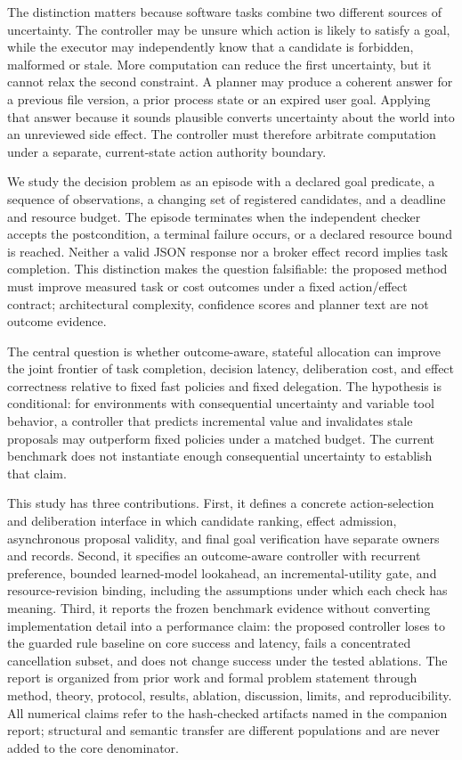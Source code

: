 \documentclass[11pt]{article}
\begin{document}
The distinction matters because software tasks combine two different sources of uncertainty. The controller may be unsure which action is likely to satisfy a goal, while the executor may independently know that a candidate is forbidden, malformed or stale. More computation can reduce the first uncertainty, but it cannot relax the second constraint. A planner may produce a coherent answer for a previous file version, a prior process state or an expired user goal. Applying that answer because it sounds plausible converts uncertainty about the world into an unreviewed side effect. The controller must therefore arbitrate computation under a separate, current-state action authority boundary.

We study the decision problem as an episode with a declared goal predicate, a sequence of observations, a changing set of registered candidates, and a deadline and resource budget. The episode terminates when the independent checker accepts the postcondition, a terminal failure occurs, or a declared resource bound is reached. Neither a valid JSON response nor a broker effect record implies task completion. This distinction makes the question falsifiable: the proposed method must improve measured task or cost outcomes under a fixed action/effect contract; architectural complexity, confidence scores and planner text are not outcome evidence.

The central question is whether outcome-aware, stateful allocation can improve the joint frontier of task completion, decision latency, deliberation cost, and effect correctness relative to fixed fast policies and fixed delegation. The hypothesis is conditional: for environments with consequential uncertainty and variable tool behavior, a controller that predicts incremental value and invalidates stale proposals may outperform fixed policies under a matched budget. The current benchmark does not instantiate enough consequential uncertainty to establish that claim.

This study has three contributions. First, it defines a concrete action-selection and deliberation interface in which candidate ranking, effect admission, asynchronous proposal validity, and final goal verification have separate owners and records. Second, it specifies an outcome-aware controller with recurrent preference, bounded learned-model lookahead, an incremental-utility gate, and resource-revision binding, including the assumptions under which each check has meaning. Third, it reports the frozen benchmark evidence without converting implementation detail into a performance claim: the proposed controller loses to the guarded rule baseline on core success and latency, fails a concentrated cancellation subset, and does not change success under the tested ablations. The report is organized from prior work and formal problem statement through method, theory, protocol, results, ablation, discussion, limits, and reproducibility. All numerical claims refer to the hash-checked artifacts named in the companion report; structural and semantic transfer are different populations and are never added to the core denominator.
\end{document}
